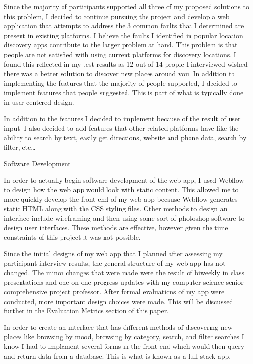 \documentclass[12pt,twocolumn]{article}
\begin{document}
Since the majority of participants supported all three of my proposed solutions to this problem, I decided to continue pursuing the project and develop a web application that attempts to address the 3 common faults that I determined are present in existing platforms. I believe the faults I identified in popular location discovery apps contribute to the larger problem at hand. This problem is that people are not satisfied with using current platforms for discovery locations.  I found this reflected in my test results as 12 out of 14 people I interviewed wished there was a better solution to discover new places around you. In addition to implementing the features that the majority of people supported, I decided to  implement features that people suggested. This is part of what is typically done in user centered design.

In addition to the features I decided to implement because of the result of user input, I also decided to add features that other related platforms have like the ability to search by text, easily get directions, website and phone data, search by filter, etc…

Software Development


In order to actually begin software development of  the web app, I used Webflow to design how the web app would look with static content. This allowed me to more quickly develop the front end of my web app because Webflow generates static HTML along  with the CSS styling files. Other methods to design an interface include wireframing and then using some sort of photoshop software to design user interfaces. These methods are effective, however given the time constraints of this project it was not possible.


Since the initial designs of my web app that I planned after assessing my participant interview results, the general structure of my web app has not changed. The minor changes that were made were the result of biweekly in class  presentations and one on one progress updates with my computer science senior comprehensive project professor. After formal evaluations of my app  were conducted, more important design choices were made. This will be discussed further in the Evaluation Metrics section of this paper.

In order to create an interface  that has different methods of discovering new places like browsing by mood, browsing by category, search, and filter searches I know I had to implement several forms in the front end which would then query and return data from a database. This is what is known as a full stack app. 
\end{document}
